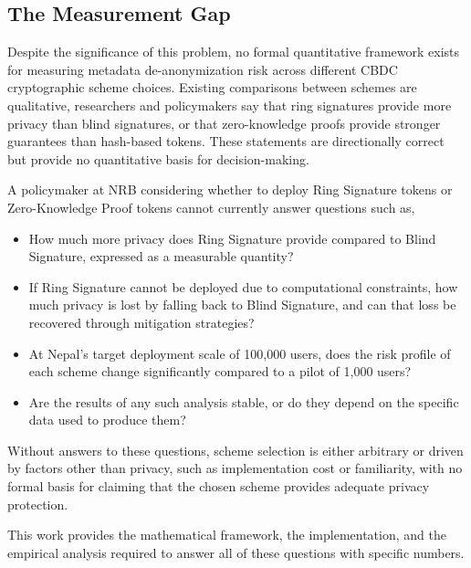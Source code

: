 \subsection{The Measurement Gap}

Despite the significance of this problem, no formal
quantitative framework exists for measuring metadata
de-anonymization risk across different CBDC cryptographic
scheme choices. Existing comparisons between schemes are
qualitative, researchers and policymakers say that ring
signatures provide more privacy than blind signatures,
or that zero-knowledge proofs provide stronger guarantees
than hash-based tokens. These statements are directionally
correct but provide no quantitative basis for decision-making.

A policymaker at NRB considering whether to deploy Ring
Signature tokens or Zero-Knowledge Proof tokens cannot currently answer
questions such as,

\begin{itemize}
    \item How much more privacy does Ring Signature
    provide compared to Blind Signature, expressed as
    a measurable quantity?

    \item If Ring Signature cannot be deployed due to
    computational constraints, how much privacy is lost
    by falling back to Blind Signature, and can that
    loss be recovered through mitigation strategies?

    \item At Nepal's target deployment scale of
    100,000 users, does the risk profile of each scheme
    change significantly compared to a pilot of 1,000
    users?

    \item Are the results of any such analysis stable,
    or do they depend on the specific data used to
    produce them?
\end{itemize}

Without answers to these questions, scheme selection
is either arbitrary or driven by factors other than
privacy, such as implementation cost or familiarity,
with no formal basis for claiming that the chosen
scheme provides adequate privacy protection.

This work provides the mathematical framework,
the implementation, and the empirical analysis required
to answer all of these questions with specific numbers.

